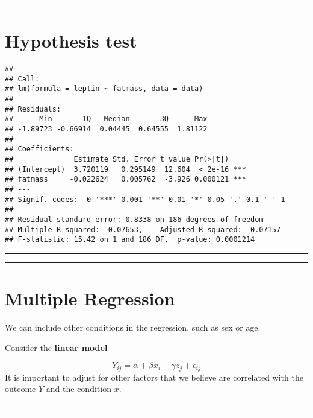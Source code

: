 \documentclass[
]{book}
\begin{document}
\begin{center}\rule{0.5\linewidth}{0.5pt}\end{center}

\hypertarget{hypothesis-test}{%
\section{Hypothesis test}\label{hypothesis-test}}

\begin{verbatim}
## 
## Call:
## lm(formula = leptin ~ fatmass, data = data)
## 
## Residuals:
##      Min       1Q   Median       3Q      Max 
## -1.89723 -0.66914  0.04445  0.64555  1.81122 
## 
## Coefficients:
##              Estimate Std. Error t value Pr(>|t|)    
## (Intercept)  3.720119   0.295149  12.604  < 2e-16 ***
## fatmass     -0.022624   0.005762  -3.926 0.000121 ***
## ---
## Signif. codes:  0 '***' 0.001 '**' 0.01 '*' 0.05 '.' 0.1 ' ' 1
## 
## Residual standard error: 0.8338 on 186 degrees of freedom
## Multiple R-squared:  0.07653,    Adjusted R-squared:  0.07157 
## F-statistic: 15.42 on 1 and 186 DF,  p-value: 0.0001214
\end{verbatim}

\begin{center}\rule{0.5\linewidth}{0.5pt}\end{center}

\begin{center}\rule{0.5\linewidth}{0.5pt}\end{center}

\hypertarget{multiple-regression}{%
\section{Multiple Regression}\label{multiple-regression}}

We can include other conditions in the regression, such as sex or age.

Consider the \textbf{linear model}

\[Y_{ij} = \alpha + \beta x_i +\gamma z_j+\epsilon_{ij}\]
It is important to adjust for other factors that we believe are correlated with the outcome \(Y\) and the condition \(x\).

\begin{center}\rule{0.5\linewidth}{0.5pt}\end{center}

\begin{center}\rule{0.5\linewidth}{0.5pt}\end{center}
\end{document}
